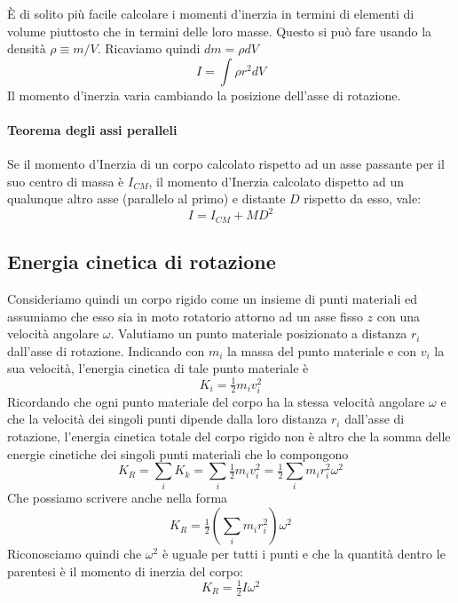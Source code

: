 \documentclass[a4paper,11pt,oneside]{book}
\begin{document}
È di solito più facile calcolare i momenti d’inerzia in termini di elementi di volume piuttosto che in termini delle loro masse.
Questo si può fare usando la densità $\rho \equiv m/V$. Ricaviamo quindi $dm = \rho dV$
\begin{equation*}
    I = \int \rho r^2 dV
\end{equation*}
Il momento d'inerzia varia cambiando la posizione dell'asse di rotazione.

\paragraph{Teorema degli assi peralleli} Se il momento d'Inerzia di un corpo calcolato rispetto ad un asse passante per il suo centro di massa è $I_{CM}$, il momento d'Inerzia
calcolato dispetto ad un qualunque altro asse (parallelo al primo) e distante $D$ rispetto da esso, vale:
\begin{equation*}
    I = I_{CM} + MD^2
\end{equation*}

\subsection{Energia cinetica di rotazione}
Consideriamo quindi un corpo rigido come un insieme di punti materiali ed assumiamo che esso sia in moto rotatorio attorno ad un asse fisso
$z$ con una velocità angolare $\omega$.
Valutiamo un punto materiale posizionato a distanza $r_i$ dall'asse di rotazione. Indicando con $m_i$ la massa del punto materiale e con
$v_i$ la sua velocità, l'energia cinetica di tale punto materiale è
\begin{equation*}
    K_i = \tfrac{1}{2} m_i v_i^2
\end{equation*}
Ricordando che ogni punto materiale del corpo ha la stessa velocità angolare $\omega$ e che la velocità dei singoli punti dipende dalla loro distanza $r_i$
dall'asse di rotazione, l'energia cinetica totale del corpo rigido non è altro che la somma delle energie cinetiche dei singoli
punti materiali che lo compongono
\begin{equation*}
    K_R = \sum_i K_k = \sum_i \tfrac{1}{2} m_i v_i^2 = \tfrac{1}{2} \sum_i m_i r_i^2 \omega^2
\end{equation*}
Che possiamo scrivere anche nella forma
\begin{equation*}
    K_R = \tfrac{1}{2} \left(\sum_i m_i r_i^2 \right) \omega^2
\end{equation*}
Riconosciamo quindi che $\omega^2$ è uguale per tutti i punti e che la quantità dentro le parentesi è il momento di inerzia del corpo:
\begin{equation*}
    K_R = \tfrac{1}{2} I \omega^2
\end{equation*}
\end{document}
